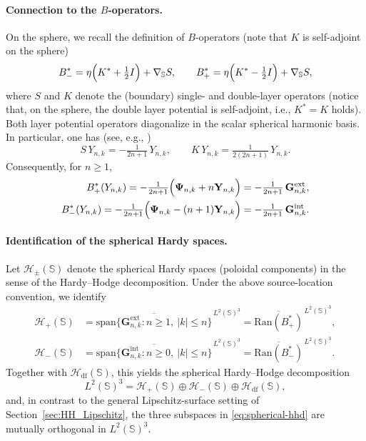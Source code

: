 \documentclass[a4paper, 11pt]{article}
\renewcommand{\SS}{\mathbb{S}}
\begin{document}
\paragraph{Connection to the $B$-operators.}
On the sphere, we recall the definition of $B$-operators (note that $K$ is self-adjoint on the sphere)
\begin{equation}\label{eq:Bpm-def}
B_-^{\ast} = \eta\Bigl(K^*+\tfrac12 I\Bigr) + \nabla_\SS S ,\qquad
B_+^{\ast} = \eta\Bigl(K^*-\tfrac12 I\Bigr) + \nabla_\SS S, 
\end{equation}
where $S$ and $K$ denote the (boundary) single- and double-layer operators (notice that, on the sphere, the double layer potential is self-adjoint, i.e., $K^{\ast}=K$ holds). Both layer potential operators diagonalize in the scalar spherical harmonic basis. In particular, one has (see, e.g., \cite{Gerhards2025})
\begin{equation}\label{eq:SK-eigs}
S\,Y_{n,k}=-\tfrac{1}{2n+1}\,Y_{n,k},\qquad
K\,Y_{n,k}=\tfrac{1}{2(2n+1)}\,Y_{n,k}.
\end{equation}
Consequently, for $n\ge1$,
\begin{align}\label{eq:Bpm-on-Y-correct}
B_+^{\ast}(Y_{n,k})
=-\tfrac{1}{2n+1}\Bigl( \mathbf\Psi_{n,k}+n\mathbf Y_{n,k}\Bigr)
=-\tfrac{1}{2n+1}\,\mathbf G^{\mathrm{ext}}_{n,k},
\\
B_-^{\ast}(Y_{n,k})
=-\tfrac{1}{2n+1}\Bigl( \mathbf\Psi_{n,k}-(n+1)\mathbf Y_{n,k}\Bigr)
=-\tfrac{1}{2n+1}\,\mathbf G^{\mathrm{int}}_{n,k}.
\end{align}

\paragraph{Identification of the spherical Hardy spaces.}
Let $\mathcal H_\pm(\SS)$ denote the spherical Hardy spaces (poloidal components) in the sense of the Hardy--Hodge decomposition. Under the above source-location convention, we identify
\begin{align}\label{eq:Hpm-id}
\mathcal H_+(\SS)&=\overline{\mathrm{span}\{\mathbf G^{\mathrm{ext}}_{n,k}: n\ge1,\ |k|\le n\}}^{\,L^2(\SS)^3}
=\overline{\mathrm{Ran}(B_+^{\ast})}^{\,L^2(\SS)^3},
\\
\mathcal H_-(\SS)&=\overline{\mathrm{span}\{\mathbf G^{\mathrm{int}}_{n,k}:n\ge0,\ |k|\le n\}}^{\,L^2(\SS)^3}
=\overline{\mathrm{Ran}(B_-^{\ast})}^{\,L^2(\SS)^3}.
\end{align}
Together with $\mathcal H_{\mathrm{df}}(\SS)$, this yields the spherical Hardy--Hodge decomposition
\begin{equation}\label{eq:spherical-hhd}
L^2(\SS)^3=\mathcal H_+(\SS)\oplus \mathcal H_-(\SS)\oplus \mathcal H_{\mathrm{df}}(\SS),
\end{equation}
and, in contrast to the general Lipschitz-surface setting of Section~\ref{sec:HH_Lipschitz}, the three subspaces in \eqref{eq:spherical-hhd} are mutually orthogonal in $L^2(\SS)^3$.
\end{document}

